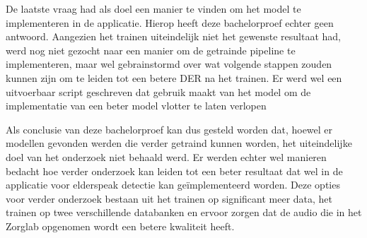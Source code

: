 De laatste vraag had als doel een manier te vinden om het model te implementeren in de applicatie. Hierop heeft deze bachelorproef echter geen antwoord. Aangezien het trainen uiteindelijk niet het gewenste resultaat had, werd nog niet gezocht naar een manier om de getrainde pipeline te implementeren, maar wel gebrainstormd over wat volgende stappen zouden kunnen zijn om te leiden tot een betere DER na het trainen. Er werd wel een uitvoerbaar script geschreven dat gebruik maakt van het model om de implementatie van een beter model vlotter te laten verlopen

Als conclusie van deze bachelorproef kan dus gesteld worden dat, hoewel er modellen gevonden werden die verder getraind kunnen worden, het uiteindelijke doel van het onderzoek niet behaald werd. Er werden echter wel manieren bedacht hoe verder onderzoek kan leiden tot een beter resultaat dat wel in de applicatie voor elderspeak detectie kan geïmplementeerd worden. Deze opties voor verder onderzoek bestaan uit het trainen op significant meer data, het trainen op twee verschillende databanken en ervoor zorgen dat de audio die in het Zorglab opgenomen wordt een betere kwaliteit heeft.